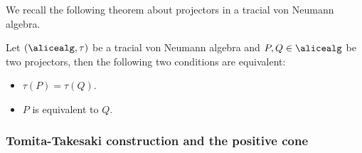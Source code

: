 We recall the following theorem about projectors in a tracial von Neumann algebra. 
\begin{proposition}  \label{prop:projectorequ}
	Let $(\alicealg, \tau)$ be a tracial von Neumann algebra and $P, Q \in \alicealg$ be two projectors, then the following two conditions are equivalent: 
	\begin{itemize}
		\item $\tau(P) = \tau(Q)$.
		\item $P$ is equivalent to $Q$.
	\end{itemize}
\end{proposition}

\subsubsection{Tomita-Takesaki construction and the positive cone}

